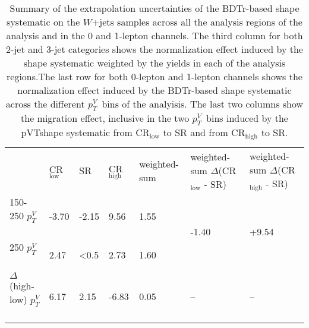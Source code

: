 \begin{table}[!htb]
{\begin{tabular}{lllllll}
      & CR$_{\text{low}}$ & SR &  CR$_{\text{high}}$ & weighted-sum &   weighted-sum $\Delta$(CR$_{\text{low}}$ - SR)  & weighted-sum $\Delta$(CR$_{\text{high}}$ - SR)         \\
      150-250 $p_T^V$\              & -3.70  & -2.15 & 9.56  & 1.55 &    \multirow{2}{*}{-1.40}     &   \multirow{2}{*}{+9.54}     \\
      250 $p_T^V$\                  &  2.47  & <0.5  & 2.73  & 1.60 &        &        \\
      $\Delta$(high-low) $p_T^V$\   &  6.17  & 2.15  & -6.83 & 0.05 &   --      &    --  \\
      \bottomrule
    \end{tabular}
  }
  \caption{Summary of the extrapolation uncertainties of the BDTr-based shape
    systematic on the $W$+jets samples across all the analysis regions of the
    analysis and in the 0 and 1-lepton channels. The third column for both 2-jet
    and 3-jet categories shows the normalization effect induced by the shape
    systematic weighted by the yields in each of the analysis regions.The last row
    for both 0-lepton and 1-lepton channels shows the normalization effect induced
    by the BDTr-based shape systematic across the different $p_T^V$\ bins of the
    analyisis. The last two columns show the migration effect, inclusive in the
    two $p_T^V$\ bins induced by the pVTshape systematic from CR$_{\text{low}}$
    to SR and from CR$_{\text{high}}$ to SR.}
  \label{tab:wjets-extrapolation_uncertainties_BDTr}
\end{table}